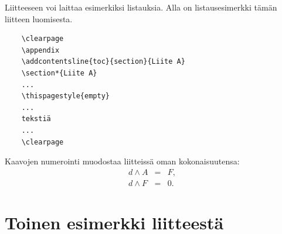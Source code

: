 \documentclass[finnish,12pt,a4paper,pdftex]{article}
\begin{document}
Liitteeseen voi laittaa esimerkiksi listauksia. Alla on 
listausesimerkki tämän liitteen luomisesta. 

\begin{verbatim}
	\clearpage
	\appendix
	\addcontentsline{toc}{section}{Liite A}
	\section*{Liite A}
	...
	\thispagestyle{empty}
	...
	tekstiä
	...
	\clearpage
\end{verbatim}

Kaavojen numerointi muodostaa liitteissä oman kokonaisuutensa:
\begin{eqnarray}
d \wedge A  &=& F, \label{liitekaava1}\\
d \wedge F  &=& 0. \label{liitekaava2}
\end{eqnarray}


\clearpage
\section{Toinen esimerkki liitteestä\label{LiiteB}}

\renewcommand{\theequation}{B\arabic{equation}}
\setcounter{equation}{0}  
\renewcommand{\thefigure}{B\arabic{figure}}
\setcounter{figure}{0}
\renewcommand{\thetable}{B\arabic{table}}
\setcounter{table}{0}
\end{document}
